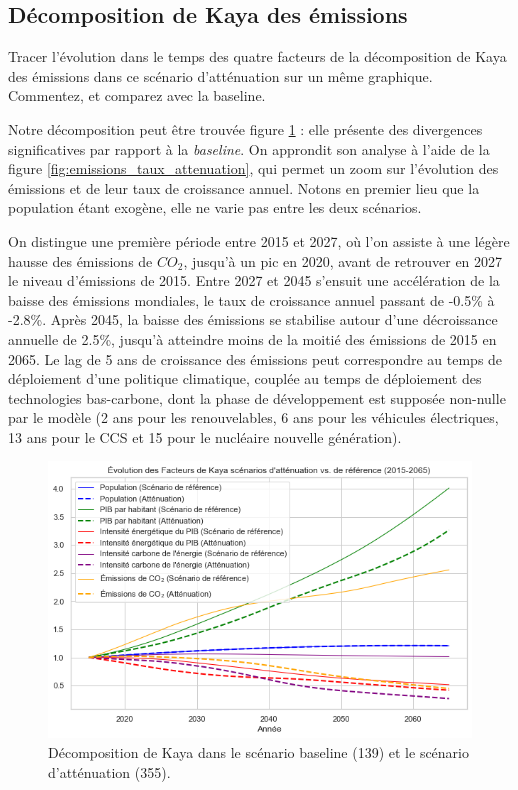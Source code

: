 \documentclass[a4,11pt]{aleph-notas}
\newcommand{\ans}[1]{
\begin{mdframed}[
    roundcorner=10pt,     %
    backgroundcolor=gray!20, %
    linecolor=black,      %
    linewidth=1pt,        %
    innertopmargin=10pt,  %
    innerbottommargin=10pt, %
    innerleftmargin=10pt,  %
    innerrightmargin=10pt  %
]
#1
\end{mdframed}
}
\begin{document}
\subsection{Décomposition de Kaya des émissions}

\ans{Tracer l’évolution dans le temps des quatre facteurs de la décomposition de Kaya des émissions dans ce scénario d’atténuation sur un même graphique. Commentez, et comparez avec la baseline.}

Notre décomposition peut être trouvée figure \ref{fig:kaya_attenuation} : elle présente des divergences significatives par rapport à la \textit{baseline}. On approndit son analyse à l'aide de la figure \ref{fig:emissions_taux_attenuation}, qui permet un zoom sur l'évolution des émissions et de leur taux de croissance annuel.
Notons en premier lieu que la population étant exogène, elle ne varie pas entre les deux scénarios.

On distingue une première période entre 2015 et 2027, où l'on assiste à une légère hausse des émissions de $CO_2$, jusqu'à un pic en 2020, avant de retrouver en 2027 le niveau d'émissions de 2015. Entre 2027 et 2045 s'ensuit une accélération de la baisse des émissions mondiales, le taux de croissance annuel passant de -0.5\% à -2.8\%. Après 2045, la baisse des émissions se stabilise autour d'une décroissance annuelle de 2.5\%, jusqu'à atteindre moins de la moitié des émissions de 2015 en 2065. Le lag de 5 ans de croissance des émissions peut correspondre au temps de déploiement d'une politique climatique, couplée au temps de déploiement des technologies bas-carbone, dont la phase de développement est supposée non-nulle par le modèle (2 ans pour les renouvelables, 6 ans pour les véhicules électriques, 13 ans pour le CCS et 15 pour le nucléaire nouvelle génération).

\begin{figure}[H]
    \centering
    \includegraphics[width=\textwidth]{images_IMACLIM/kaya_attenuation.png}
    \caption{Décomposition de Kaya dans le scénario baseline (139) et le scénario d'atténuation (355).}
    \label{fig:kaya_attenuation}
\end{figure}
\end{document}
